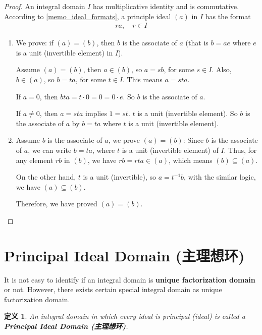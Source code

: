 \documentclass[utf8]{ctexbook}
\newtheorem{definition}{定义}[section]
\begin{document}
\begin{proof}
An integral domain $I$ has multiplicative identity and is commutative. According to \ref{memo_ideal_formats}, a principle ideal $(a)$ in $I$ has the format
\begin{align*}
r a, \quad r \in I
\end{align*}

\begin{enumerate}
\item{We prove: if $(a) = (b)$, then $b$ is the associate of $a$  (that is $b= a e$ where $e$ is a unit (invertible element) in $I$).

Assume $(a) = (b)$, then $a \in (b)$, so $a = s b $, for some $s \in I $. Also, $b \in (a)$, so $b = t a$, for some $t \in I$. This means $a = s t a$. 

If $a=0$, then $b  t a = t \cdot 0 = 0 = 0 \cdot e$. So $b$ is the associate of $a$.

If $a \neq 0$, then $a = s t a $ implies $1 = s t $. $t$ is a unit (invertible element). So $b$ is the associate of $a$ by $b = t a $ where $t$ is a unit (invertible element).
}
\item{Assume $b$ is the associate of $a$, we prove $(a) = (b)$: Since $b$ is the associate of $a$, we can write $b = t a$, where $t$ is a unit (invertible element) of $I$. Thus, for any element $ rb $ in $(b)$, we have $rb = r t a \in (a) $, which means $(b) \subseteq (a)$.

On the other hand, $t$ is a unit (invertible), so $a = t^{-1} b$, with the similar logic, we have $(a) \subseteq (b)$.

Therefore, we have proved $(a) = (b)$.
}
\end{enumerate}

\end{proof}

\section{Principal Ideal Domain (主理想环)}

It is not easy to identify if an integral domain is \textbf{unique factorization domain} or not. However, there exists certain special integral domain as unique factorization domain.

\begin{definition}
An integral domain in which every ideal is principal (ideal) is called a \textbf{Principal Ideal Domain (主理想环)}.
\end{definition}
\end{document}
